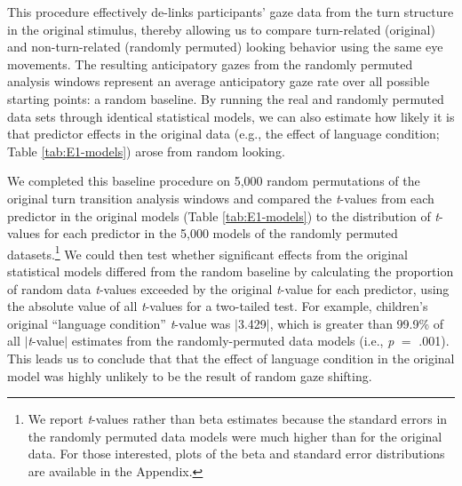 \documentclass[authoryear, 12pt]{elsarticle}
\begin{document}
This procedure effectively de-links participants' gaze data from the turn structure in the original stimulus, thereby allowing us to compare turn-related (original) and non-turn-related (randomly permuted) looking behavior using the same eye movements. The resulting anticipatory gazes from the randomly permuted analysis windows represent an average anticipatory gaze rate over all possible starting points: a random baseline. By running the real and randomly permuted data sets through identical statistical models, we can also estimate how likely it is that predictor effects in the original data (e.g., the effect of language condition; Table \ref{tab:E1-models}) arose from random looking.

We completed this baseline procedure on 5,000 random permutations of the original turn transition analysis windows and compared the \textit{t}-values from each predictor in the original models (Table \ref{tab:E1-models}) to the distribution of \textit{t}-values for each predictor in the 5,000 models of the randomly permuted datasets.\footnote{We report \textit{t}-values rather than beta estimates because the standard errors in the randomly permuted data models were much higher than for the original data. For those interested, plots of the beta and standard error distributions are available in the Appendix.} We could then test whether significant effects from the original statistical models differed from the random baseline by calculating the proportion of random data \textit{t}-values exceeded by the original \textit{t}-value for each predictor, using the absolute value of all \textit{t}-values for a two-tailed test. For example, children's original ``language condition'' \textit{t}-value was $|$3.429$|$, which is greater than 99.9\% of all $|$\textit{t}-value$|$ estimates from the randomly-permuted data models (i.e., \textit{p} $=$ .001). This leads us to conclude that that the effect of language condition in the original model was highly unlikely to be the result of random gaze shifting.
\end{document}
